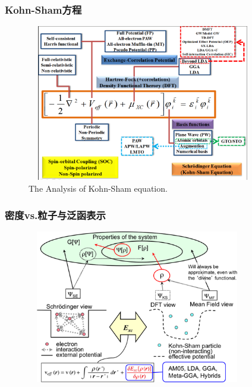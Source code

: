 \frame                               %
{
	\frametitle{\textrm{Kohn-Sham}方程}
\begin{figure}[h!]
\centering
\vspace*{-0.21in}
\hspace*{-0.1in}
\includegraphics[height=2.7in,width=4.0in,viewport=2 5 1162 880,clip]{Figures/DFT.png}
\caption{\tiny \textrm{The Analysis of Kohn-Sham equation.}}%
\label{DFT}
\end{figure}
}

\frame
{
	\frametitle{密度\textrm{vs.}粒子与泛函表示}
\begin{figure}[h!]
\vskip -10pt
\centering
\includegraphics[height=2.65in,width=3.8in,viewport=0 0 362 275,clip]{Figures/DFT-particle-density.png}
\caption{\fontsize{6.0pt}{4.5pt}}%
\label{Schrodinger-equation-vs-Kohn-Sham-equation}
\end{figure}
}

